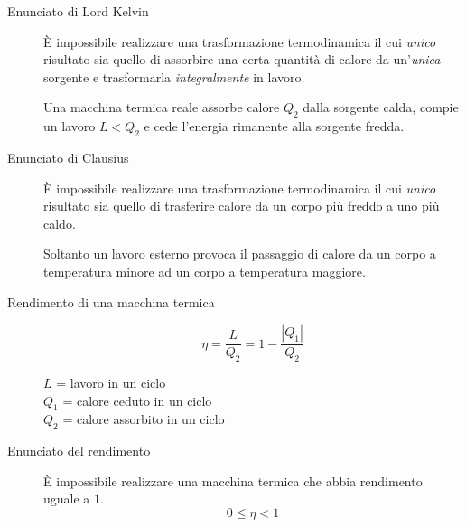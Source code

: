 \documentclass[a4paper,11pt,italian]{article}
\begin{document}
\begin{description}
  \item[Enunciato di Lord Kelvin] 
  È impossibile realizzare una trasformazione termodinamica il cui \emph{unico} risultato sia quello di assorbire una certa quantità di calore da un'\emph{unica} sorgente e trasformarla \emph{integralmente} in lavoro.
  
  Una macchina termica reale assorbe calore $ Q_2 $ dalla sorgente calda, compie un lavoro $ L< Q_2 $ e cede l'energia rimanente alla sorgente fredda.
  
  \item[Enunciato di Clausius] 
  È impossibile realizzare una trasformazione termodinamica il cui \emph{unico} risultato sia quello di trasferire calore da un corpo più freddo a uno più caldo.
   
   Soltanto un lavoro esterno provoca il passaggio di calore da un corpo a temperatura minore ad un corpo a temperatura maggiore.

  \item[Rendimento di una macchina termica]
  \[ \eta = \frac{L}{Q_2} = 1 - \frac{|Q_1|}{Q_2} \]
  \begin{multicols}{2}
  $ L $ = lavoro in un ciclo\\
  $ Q_1 $ = calore ceduto in un ciclo\\
  $ Q_2 $ = calore assorbito in un ciclo
  \end{multicols}
  
  \item[Enunciato del rendimento] 
  È impossibile realizzare una macchina termica che abbia rendimento uguale a $ 1 $.
  \[ 0 \leq \eta < 1 \]
  
  
  


\end{description}
\end{document}
